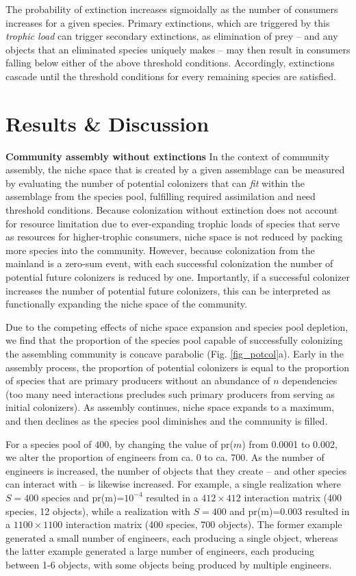 \documentclass[twocolumn,preprintnumbers,amsmath,amssymb,superscriptaddress]{revtex4}
\begin{document}
The probability of extinction increases sigmoidally as the number of consumers increases for a given species.
Primary extinctions, which are triggered by this \emph{trophic load} can trigger secondary extinctions, as elimination of prey -- and any objects that an eliminated species uniquely makes -- may then result in consumers falling below either of the above threshold conditions.
Accordingly, extinctions cascade until the threshold conditions for every remaining species are satisfied.


\section*{Results \& Discussion}




{\bf Community assembly without extinctions}
In the context of community assembly, the niche space that is created by a given assemblage can be measured by evaluating the number of potential colonizers that can \emph{fit} within the assemblage from the species pool, fulfilling required assimilation and need threshold conditions.
Because colonization without extinction does not account for resource limitation due to ever-expanding trophic loads of species that serve as resources for higher-trophic consumers, niche space is not reduced by packing more species into the community.
However, because colonization from the mainland is a zero-sum event, with each successful colonization the number of potential future colonizers is reduced by one.
Importantly, if a successful colonizer increases the number of potential future colonizers, this can be interpreted as functionally expanding the niche space of the community.




Due to the competing effects of niche space expansion and species pool depletion, we find that the proportion of the species pool capable of successfully colonizing the assembling community is concave parabolic (Fig. \ref{fig_potcol}a).
Early in the assembly process, the proportion of potential colonizers is equal to the proportion of species that are primary producers without an abundance of $n$ dependencies (too many need interactions precludes such primary producers from serving as initial colonizers).
As assembly continues, niche space expands to a maximum, and then declines as the species pool diminishes and the community is filled.


For a species pool of $400$, by changing the value of pr($m$) from 0.0001 to 0.002, we alter the proportion of engineers from ca. 0 to ca. 700.
As the number of engineers is increased, the number of objects that they create -- and other species can interact with -- is likewise increased.
For example, a single realization where $S=400$ species and pr(m)=$10^{-4}$ resulted in a $412\times412$ interaction matrix (400 species, 12 objects), while a realization with $S=400$ and pr(m)=$0.003$ resulted in a $1100\times1100$ interaction matrix (400 species, 700 objects).
The former example generated a small number of engineers, each producing a single object, whereas the latter example generated a large number of engineers, each producing between 1-6 objects, with some objects being produced by multiple engineers.
\end{document}

